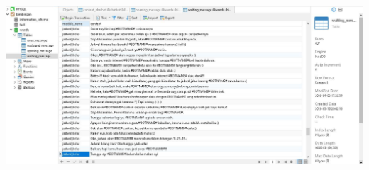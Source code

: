 \documentclass{article}
\newcounter{saveenumi}
\newcommand{\seti}{\setcounter{saveenumi}{\value{enumi}}} %
\begin{document}
\begin{enumerate}
            \newline
            \includegraphics[scale=0.3]{31.4.jpg}
            \newline
          	\newline
            \seti %
        \end{enumerate}
\end{document}
